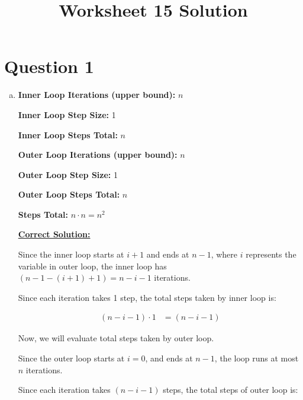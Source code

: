 \documentclass[12pt]{article}
\begin{document}
\title{Worksheet 15 Solution}
\maketitle

\section*{Question 1}
\begin{enumerate}[a.]
    \item

    \textbf{Inner Loop Iterations (upper bound):} $n$

    \textbf{Inner Loop Step Size:} 1

    \textbf{Inner Loop Steps Total:} $n$

    \bigskip

    \textbf{Outer Loop Iterations (upper bound):} $n$

    \textbf{Outer Loop Step Size:} 1

    \textbf{Outer Loop Steps Total:} $n$

    \bigskip

    \textbf{Steps Total:} $n \cdot n = n^2$

    \begin{mdframed}

    \bigskip

    \underline{\textbf{Correct Solution:}}

    Since the inner loop starts at $i+1$ and ends at $n-1$, where $i$ represents
    the variable in outer loop, the inner loop has $(n-1 - (i+1) + 1) = n - i - 1$
    iterations.

    \bigskip

    Since each iteration takes 1 step, the total steps taken by inner loop is:

    \begin{align}
        (n - i - 1) \cdot 1 &= (n - i - 1)
    \end{align}

    \bigskip

    Now, we will evaluate total steps taken by outer loop.

    \bigskip

    Since the outer loop starts at $i = 0$, and ends at $n-1$, the loop runs
    at most $n$ iterations.

    \bigskip

    Since each iteration takes $(n -i - 1)$ steps, the total steps of outer
    loop is:


\end{mdframed}
\end{enumerate}
\end{document}
